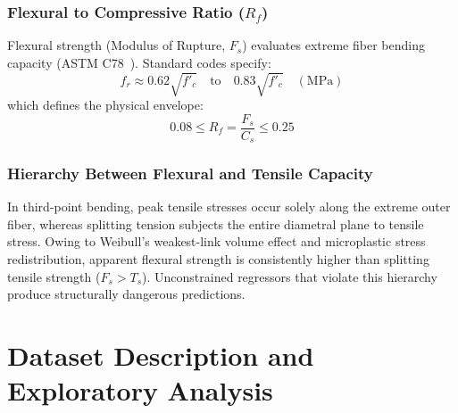\documentclass[conference]{IEEEtran}
\begin{document}
\subsubsection{Flexural to Compressive Ratio ($R_f$)}
Flexural strength (Modulus of Rupture, $F_s$) evaluates extreme fiber bending capacity (ASTM C78~\cite{astm_c78}). Standard codes specify:
\begin{equation}
    f_r \approx 0.62 \sqrt{f'_c} \quad \text{to} \quad 0.83 \sqrt{f'_c} \quad (\text{MPa})
\end{equation}
which defines the physical envelope:
\begin{equation}
    0.08 \le R_f = \frac{F_s}{C_s} \le 0.25
\end{equation}

\subsubsection{Hierarchy Between Flexural and Tensile Capacity}
In third-point bending, peak tensile stresses occur solely along the extreme outer fiber, whereas splitting tension subjects the entire diametral plane to tensile stress. Owing to Weibull's weakest-link volume effect and microplastic stress redistribution, apparent flexural strength is consistently higher than splitting tensile strength ($F_s > T_s$). Unconstrained regressors that violate this hierarchy produce structurally dangerous predictions.

\section{Dataset Description and Exploratory Analysis}
\end{document}
